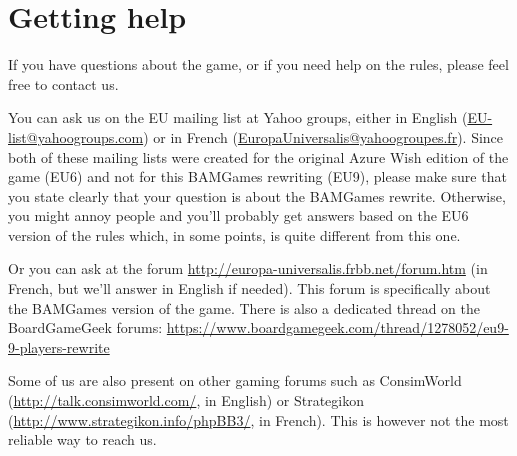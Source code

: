 \section*{Getting help}
If you have questions about the game, or if you need help on the rules, please
feel free to contact us.

You can ask us on the EU mailing list at Yahoo groups, either in English
(\url{EU-list@yahoogroups.com}) or in French
(\url{EuropaUniversalis@yahoogroupes.fr}). Since both of these mailing lists
were created for the original Azure Wish edition of the game (EU6) and not for
this BAMGames rewriting (EU9), please make sure that you state clearly that
your question is about the BAMGames rewrite. Otherwise, you might annoy people
and you'll probably get answers based on the EU6 version of the rules which,
in some points, is quite different from this one.

Or you can ask at the forum \url{http://europa-universalis.frbb.net/forum.htm}
(in French, but we'll answer in English if needed). This forum is specifically
about the BAMGames version of the game. There is also a dedicated thread on
the BoardGameGeek forums:
\url{https://www.boardgamegeek.com/thread/1278052/eu9-9-players-rewrite}

Some of us are also present on other gaming forums such as ConsimWorld
(\url{http://talk.consimworld.com/}, in English) or Strategikon
(\url{http://www.strategikon.info/phpBB3/}, in French). This is however not
the most reliable way to reach us.

